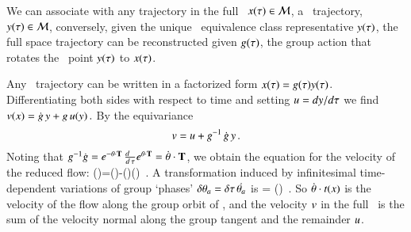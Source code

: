 


We can associate with any trajectory in the full \statesp\,
$x(\tau) \in {\cal M}$, a \reducedsp\ trajectory, $y(\tau) \in {\cal M}$,
conversely, given the unique \reducedsp\ equivalence class
representative  $y(\tau)$,
the full space trajectory can be reconstructed given $g(\tau)$, the
group action that rotates the \reducedsp\ point
$y(\tau)$  to $x(\tau)$.

Any \statesp\ trajectory can be written in a factorized
form $x(\tau)=g(\tau)
y(\tau)$. Differentiating both sides with respect to time and
setting $u={dy}/{d\tau}$ we find
\(
v(x)=\dot{g} \, y+g \, u(y)
\,.
\)
By the equivariance 
\[
v=u + g^{-1} \, \dot{g} \, y
\,.
\]
Noting that $g^{-1}\dot{g}=e^{-{\bf \theta} \cdot \mathbf{T}} \,
\frac{d ~~}{d \, \tau} e^{{\bf \theta} \cdot \mathbf{T}}=\dot{{\bf \theta}}\cdot \mathbf{T}$,
we obtain the equation for the velocity of the reduced flow:
\beq
\velRed(\sspRed)=\vel(\sspRed)-\dot{\gSpace}(\sspRed)\cdot \groupTan(\sspRed)
\,.
A transformation induced by infinitesimal
time-dependent variations  of group `phases'
$\delta {\bf \theta}_a = {\delta \tau} \, \dot{{\bf \theta}_a}$ is
\beq
\dot{\ssp} = \dot{\gSpace} \cdot \groupTan(\ssp)
\,.
So $\dot{{\bf \theta}} \cdot t(x)$ is the velocity
of the flow along the group orbit of \ssp, and
the velocity $v$ in the full \statesp\ is the sum of
the velocity normal along the group tangent and the remainder $u$.

